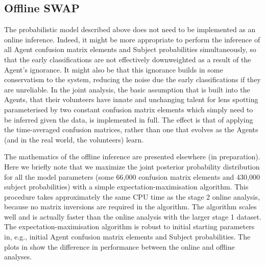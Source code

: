 \documentclass[useAMS,usenatbib,a4paper]{mn2e}
\begin{document}
\subsection{Offline SWAP}
\label{appendix:swap:offline}

The probabilistic model described above does not need to be implemented as an
online inference. Indeed, it might be more appropriate to perform the inference
of all Agent confusion matrix elements and Subject probabilities
simultaneously, so that the early classifications are not effectively
downweighted as a result of the Agent's ignorance. It might also be that this
ignorance builds in some conservatism to the system, reducing the noise due
the early classifications if they are unreliable. In the joint analysis, the
basic assumption that is built into the Agents, that their volunteers
have innate and unchanging talent for lens spotting parameterised by two 
constant confusion matrix elements which simply need to be inferred given the
data, is implemented in full. The effect is that of applying the time-averaged
confusion matrices, rather than one that evolves as the Agents (and in the
real world, the volunteers) learn. 

The mathematics of the offline inference are presented elsewhere (in
preparation). Here we briefly note that we maximize the joint posterior
probability distribution for all the model parameters (some 66,000 confusion
matrix elements and 430,000 subject probabilities) with a simple
expectation-maximisation algorithm. This procedure takes approximately the
same CPU time as the stage 2 online analysis, because no matrix inversions are
required in the algorithm. The algorithm scales well and is actually faster
than the online analysis with the larger stage 1 dataset. The
expectation-maximisation algorithm is robust to initial starting parameters
in, e.g., initial Agent confusion matrix elements and Subject probabilities.
The plots in  show the difference in performance
between the online and offline analyses. 




% 






\label{lastpage}
\bsp
\end{document}
